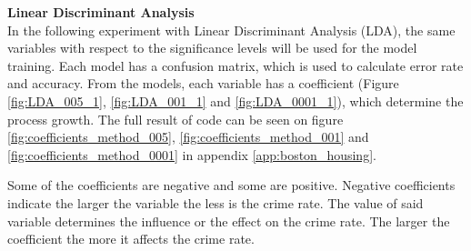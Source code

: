 \noindent
\textbf{Linear Discriminant Analysis} \\
In the following experiment with Linear Discriminant Analysis (LDA), the same variables with respect to the significance levels will be used for the model training. Each model has a confusion matrix, which is used to calculate error rate and accuracy. From the models, each variable has a coefficient (Figure \ref{fig:LDA_005_1}, \ref{fig:LDA_001_1} and \ref{fig:LDA_0001_1}), which determine the process growth. The full result of code can be seen on figure \ref{fig:coefficients_method_005}, \ref{fig:coefficients_method_001} and \ref{fig:coefficients_method_0001} in appendix \ref{app:boston_housing}.

Some of the coefficients are negative and some are positive. Negative coefficients indicate the larger the variable the less is the crime rate. The value of said variable determines the influence or the effect on the crime rate. The larger the coefficient the more it affects the crime rate. 


